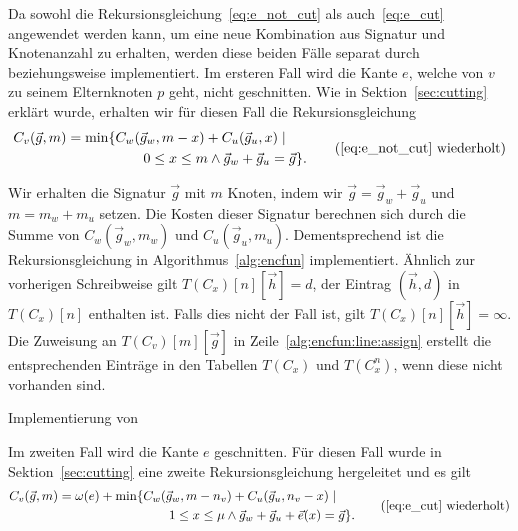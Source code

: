 Da sowohl die Rekursionsgleichung~\eqref{eq:e_not_cut} als auch~\eqref{eq:e_cut} angewendet werden kann, um eine neue Kombination aus Signatur und Knotenanzahl zu erhalten, werden diese beiden Fälle separat durch \encfun{} beziehungsweise \ecfun{} implementiert.
Im ersteren Fall wird die Kante $e$, welche von $v$ zu seinem Elternknoten $p$ geht, nicht geschnitten.
Wie in Sektion~\ref{sec:cutting} erklärt wurde, erhalten wir für diesen Fall die Rekursionsgleichung
\begin{equation*}
    \begin{aligned}
        C_v(\vec{g}, m) = \min \{ & C_w(\vec{g}_w, m - x) + C_u(\vec{g}_u, x) \mid \\
        & \qquad 0 \leq x \leq m \land \vec{g}_w + \vec{g}_u = \vec{g} \}.
    \end{aligned}
    \tag{\ref{eq:e_not_cut} wiederholt}
\end{equation*}

Wir erhalten die Signatur $\vec{g}$ mit $m$ Knoten, indem wir $\vec{g} = \vec{g}_w + \vec{g}_u$ und $m = m_w + m_u$ setzen.
Die Kosten dieser Signatur berechnen sich durch die Summe von $C_w(\vec{g}_w, m_w)$ und $C_u(\vec{g}_u, m_u)$.
Dementsprechend ist die Rekursionsgleichung in Algorithmus~\ref{alg:encfun} implementiert.
Ähnlich zur vorherigen Schreibweise gilt $T(C_x)[n][\vec{h}] = d$, der Eintrag $(\vec{h}, d)$ in $T(C_x)[n]$ enthalten ist.
Falls dies nicht der Fall ist, gilt $T(C_x)[n][\vec{h}] = \infty$.
Die Zuweisung an $T(C_v)[m][\vec{g}]$ in Zeile~\ref{alg:encfun:line:assign} erstellt die entsprechenden Einträge in den Tabellen $T(C_x)$ und $T(C_x^n)$, wenn diese nicht vorhanden sind.

\begin{algorithm}
    \caption{Implementierung von }\label{alg:encfun}
    \begin{algorithmic}[1]
            \label{alg:encfun:line:assign}
        \EndFunction
    \end{algorithmic}
\end{algorithm}

Im zweiten Fall wird die Kante $e$ geschnitten.
Für diesen Fall wurde in Sektion~\ref{sec:cutting} eine zweite Rekursionsgleichung hergeleitet und es gilt
\begin{equation*}
    \begin{aligned}
        C_v(\vec{g}, m) = \weight(e) + \min \{ & C_w(\vec{g}_w, m - n_v) + C_u(\vec{g}_u, n_v - x) \mid \\ & \qquad 1 \leq x \leq \mu \land \vec{g}_w + \vec{g}_u + \vec{e}(x) = \vec{g} \}. 
    \end{aligned}
    \tag{\ref{eq:e_cut} wiederholt}
\end{equation*}

